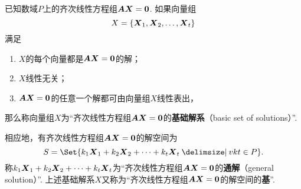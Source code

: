 \begin{definition}\label{definition:线性方程组.齐次线性方程组的基础解系}
已知数域\(P\)上的齐次线性方程组\(\boldsymbol{A}\boldsymbol{X}=\boldsymbol{0}\).
如果向量组\[
X=\{\boldsymbol{X}_1,\boldsymbol{X}_2,\dotsc,\boldsymbol{X}_t\}
\]满足
\begin{enumerate}
\item \(X\)的每个向量都是\(\boldsymbol{A}\boldsymbol{X}=\boldsymbol{0}\)的解；
\item \(X\)线性无关；
\item \(\boldsymbol{A}\boldsymbol{X}=\boldsymbol{0}\)的任意一个解都可由向量组\(X\)线性表出，%
\end{enumerate}
那么称向量组\(X\)为“齐次线性方程组\(\boldsymbol{A}\boldsymbol{X}=\boldsymbol{0}\)的\textbf{基础解系}（basic set of solutions）”.

\def\tongjie{ k_1\x_1+k_2\x_2+ \dotsb +k_t\x_t }
相应地，有齐次线性方程组\(\boldsymbol{A}\boldsymbol{X}=\boldsymbol{0}\)的解空间为\[
S = \Set{ \tongjie \given \v{k}{t} \in P }.
\]称\(\tongjie\)为“齐次线性方程组\(\boldsymbol{A}\boldsymbol{X}=\boldsymbol{0}\)的\textbf{通解}（general solution）”.
上述基础解系\(X\)又称为“齐次线性方程组\(\boldsymbol{A}\boldsymbol{X}=\boldsymbol{0}\)的解空间的\textbf{基}”.
\end{definition}

